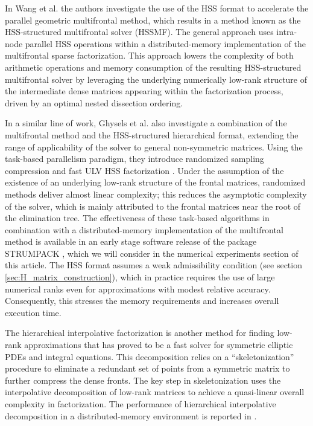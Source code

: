\documentclass[]{elsarticle}
\begin{document}
In Wang et al. \cite{Wang2016} the authors investigate the use of the HSS format \cite{Vandebril05} to accelerate the parallel geometric multifrontal method, which results in a method known as the HSS-structured multifrontal solver (HSSMF). The general approach uses intra-node parallel HSS operations within a distributed-memory implementation of the multifrontal sparse factorization. This approach lowers the complexity of both arithmetic operations and memory consumption of the resulting HSS-structured multifrontal solver by leveraging the underlying numerically low-rank structure of the intermediate dense matrices appearing within the factorization process, driven by an optimal nested dissection ordering.

In a similar line of work, Ghysels et al. \cite{Ghysels15} also investigate a combination of the multifrontal method and the HSS-structured hierarchical format, extending the range of applicability of the solver to general non-symmetric matrices. Using the task-based parallelism paradigm, they introduce randomized sampling compression \cite{martinssonRandomized2011} and fast ULV HSS factorization \cite{xia_ulv_2012}. Under the assumption of the existence of an underlying low-rank structure of the frontal matrices, randomized methods deliver almost linear complexity; this reduces the asymptotic complexity of the solver, which is mainly attributed to the frontal matrices near the root of the elimination tree. The effectiveness of these task-based algorithms in combination with a distributed-memory implementation of the multifrontal method is available in an early stage software release of the package STRUMPACK \cite{Ghysels15}, which we will consider in the numerical experiments section of this article. The HSS format assumes a weak admissibility condition (see section \ref{sec:H_matrix_construction}), which in practice requires the use of large numerical ranks even for approximations with modest relative accuracy. Consequently, this stresses the memory requirements and increases overall execution time.

The hierarchical interpolative factorization \cite{ho2015_hif_de, ho2015_hif_ie} is another method for finding low-rank approximations that has proved to be a fast solver for symmetric elliptic PDEs and integral equations. This decomposition relies on a ``skeletonization'' procedure to eliminate a redundant set of points from a symmetric matrix to further compress the dense fronts. The key step in skeletonization uses the interpolative decomposition of low-rank matrices to achieve a quasi-linear overall complexity in factorization. The performance of hierarchical interpolative decomposition in a distributed-memory environment is reported in \cite{li2016distributed}.
\end{document}
